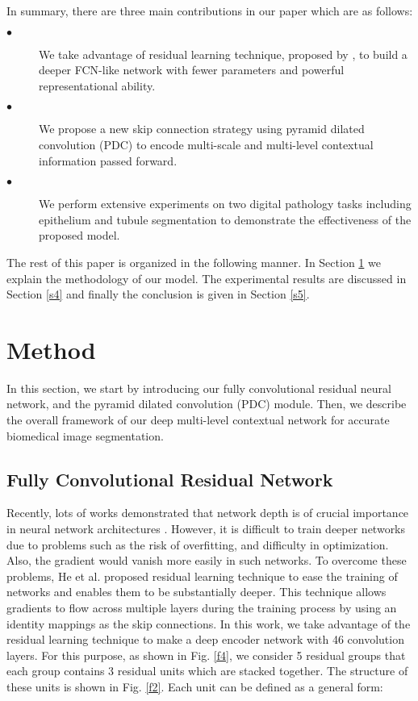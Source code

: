 \documentclass[10pt,twocolumn]{article}
\begin{document}
In summary, there are three main contributions in our paper which are
as follows:

\begin{description}
\item[$\bullet$] We take advantage of residual learning technique, proposed by \cite{r9}, to build a deeper FCN-like network with fewer parameters and powerful representational ability.
\item[$\bullet$]
We propose a new skip connection strategy using pyramid dilated convolution (PDC) to encode multi-scale and multi-level contextual information passed forward.


\item[$\bullet$] We perform extensive experiments on two digital pathology tasks including epithelium and tubule segmentation \cite{r6} to demonstrate the effectiveness of the proposed model.

\end{description}

The rest of this paper is organized in the following manner. In Section \ref{s3} we explain the methodology of our model. The experimental results are discussed in Section \ref{s4} and finally the conclusion is given in Section \ref{s5}.



\section{Method}\label{s3}
In this section, we start by introducing our fully convolutional residual neural
network, and the pyramid dilated convolution (PDC) module. Then, we describe the overall framework of our deep multi-level contextual network for accurate biomedical image segmentation.
\subsection{Fully Convolutional Residual Network}
\label{s31}
Recently, lots of works demonstrated that network depth is of crucial importance in neural network architectures \cite{r11}. However, it is difficult to train deeper networks due to problems such as the risk of overfitting, and difficulty in optimization. Also, the gradient would vanish more easily in such networks. To overcome these problems, He et al. \cite{r9} proposed residual learning technique to ease the training of networks and enables them to be substantially deeper. This technique allows gradients to flow across multiple layers during the training process by using an identity mappings as the skip connections. In this work, we take advantage of the residual learning technique to make a deep encoder network with 46 convolution layers. For this purpose, as shown in Fig. \ref{f4},  we consider 5 residual groups that each group contains 3 residual units which are stacked together. The structure of these units is shown in Fig. \ref{f2}. Each unit can be defined as a general form:
\end{document}

